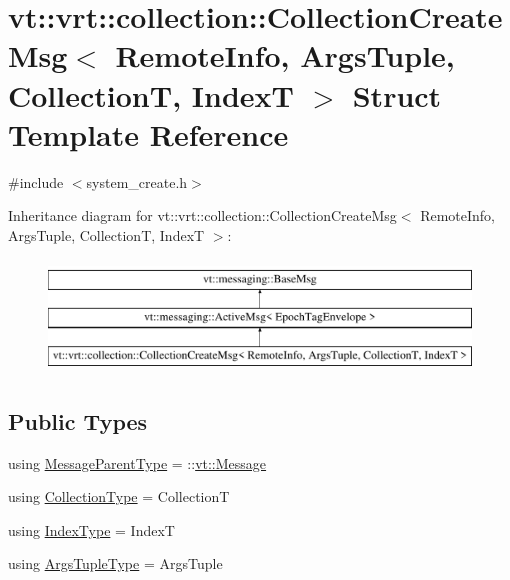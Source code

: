\hypertarget{structvt_1_1vrt_1_1collection_1_1_collection_create_msg}{}\section{vt\+:\+:vrt\+:\+:collection\+:\+:Collection\+Create\+Msg$<$ Remote\+Info, Args\+Tuple, CollectionT, IndexT $>$ Struct Template Reference}
\label{structvt_1_1vrt_1_1collection_1_1_collection_create_msg}


{\ttfamily \#include $<$system\+\_\+create.\+h$>$}

Inheritance diagram for vt\+:\+:vrt\+:\+:collection\+:\+:Collection\+Create\+Msg$<$ Remote\+Info, Args\+Tuple, CollectionT, IndexT $>$\+:\begin{figure}[H]
\begin{center}
\leavevmode
\includegraphics[height=3.000000cm]{structvt_1_1vrt_1_1collection_1_1_collection_create_msg}
\end{center}
\end{figure}
\subsection*{Public Types}
\begin{DoxyCompactItemize}
\item 
using \hyperlink{structvt_1_1vrt_1_1collection_1_1_collection_create_msg_adc7277434e5007114ad1fd10ee7cc3ec}{Message\+Parent\+Type} = \+::\hyperlink{namespacevt_a3a3ddfef40b4c90915fa43cdd5f129ea}{vt\+::\+Message}
\item 
using \hyperlink{structvt_1_1vrt_1_1collection_1_1_collection_create_msg_a32f39cc924fbbe6f445d48f5b74ded8f}{Collection\+Type} = CollectionT
\item 
using \hyperlink{structvt_1_1vrt_1_1collection_1_1_collection_create_msg_a32b4a63169ad3f9063002a91dadb2435}{Index\+Type} = IndexT
\item 
using \hyperlink{structvt_1_1vrt_1_1collection_1_1_collection_create_msg_abb55583fc386581742c169c93840744f}{Args\+Tuple\+Type} = Args\+Tuple
\end{DoxyCompactItemize}
